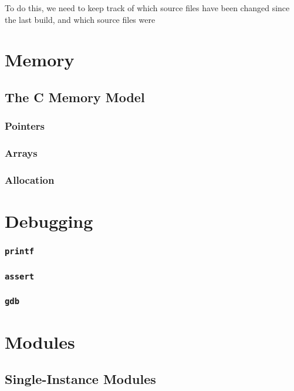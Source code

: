 \documentclass[a4paper,10pt]{report}
\newcommand{\kw}[1]{\texttt{#1}}
\begin{document}
To do this, we need to keep track of which source files have been
changed since the last build, and which source files were 

\chapter{Memory}

\section{The C Memory Model}

\subsection{Pointers}

\subsection{Arrays}

\subsection{Allocation}

\chapter{Debugging}

\subsection{\kw{printf}}

\subsection{\kw{assert}}

\subsection{\kw{gdb}}

\chapter{Modules}

\section{Single-Instance Modules}
\end{document}
